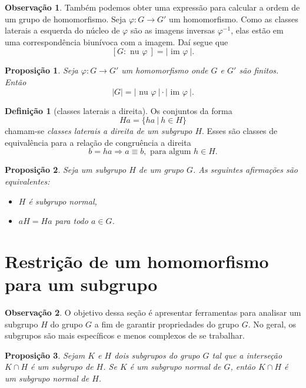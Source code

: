 \documentclass[a4paper,12pt]{report}
\theoremstyle{plain}
\newtheorem{proposicao}{Proposição}[section]
\theoremstyle{definition}
\newtheorem{definicao}{Definição}[section]
\newtheorem{observacao}{Observação}[section]
\begin{document}
\begin{observacao}
	Também podemos obter uma expressão para calcular a ordem de um grupo de
	homomorfismo. Seja \(\varphi: G\longrightarrow G'\) um homomorfismo.
	Como as classes laterais a esquerda do núcleo de \(\varphi\) são as imagens
	inversas \(\varphi^{-1}\), elas estão em uma correspondência biunívoca
	com a imagem. Daí segue que
	\[[G:\text{ nu }\varphi\ ] = |\text{ im }\varphi\ |.\]
\end{observacao}

\begin{proposicao}
	Seja \(\varphi: G\longrightarrow G'\) um
	homomorfismo onde \(G\) e \(G'\) são finitos. Então
	\[|G| = |\text{ nu }\varphi\ |\cdot|\text{ im }\varphi\ |.\]	
\end{proposicao}

\begin{definicao}[classes laterais a direita]
	Os conjuntos da forma
	\[Ha = \{ha \ | \ h \in H\}\] chamam-se \emph{classes laterais a direita de um
		subgrupo \(H\)}. Esses são classes de equivalência para a relação de
	congruência a direita
	\[b = ha \Rightarrow a \equiv b, \text{ para algum }h \in H.\]	
\end{definicao}

\begin{proposicao}
	Seja um subgrupo \(H\) de um grupo \(G\). As
	seguintes afirmações são equivalentes:
	
	\begin{itemize}
		\item
		\(H\) é subgrupo normal,
		\item
		\(aH = Ha\) para todo \(a\in G\).
	\end{itemize}	
\end{proposicao}

\section{Restrição de um homomorfismo para um subgrupo}

\begin{observacao}
	O objetivo dessa seção é apresentar ferramentas para analisar um subgrupo \(H\)
	do grupo \(G\) a fim de garantir propriedades do grupo \(G\). No geral,
	os subgrupos são mais específicos e menos complexos de se trabalhar.
\end{observacao}

\begin{proposicao}
	Sejam \(K\) e \(H\) dois subgrupos do grupo \(G\)
	tal que a interseção \(K\cap H\) é um subgrupo de \(H\). Se \(K\) é um
	subgrupo normal de \(G\), então \(K\cap H\) é um subgrupo normal de
	\(H\).	
\end{proposicao}
\end{document}
